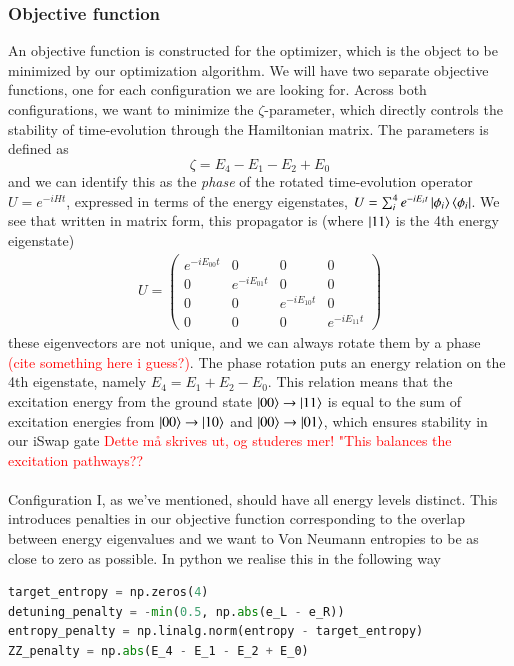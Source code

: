 \documentclass{subfiles}
\begin{document}
\subsubsection{Objective function}
An objective function is constructed for the optimizer, which is the object to be minimized by our optimization algorithm. We will have two separate objective functions, one for each configuration we are looking for. Across both configurations, we want to minimize the $\zeta$-parameter, which directly controls the stability of time-evolution through the Hamiltonian matrix. The parameters is defined as 
\begin{equation*}
    \zeta = E_4 - E_1 - E_2 + E_0
\end{equation*}
and we can identify this as the \emph{phase} of the rotated time-evolution operator $U = e^{-iHt}$, expressed in terms of the energy eigenstates, $U = \sum_i^4 e^{-iE_it}\ket{\phi_i}\bra{\phi_i}$. We see that written in matrix form, this propagator is (where $\ket{11}$ is the 4th energy eigenstate)
\begin{align*}
    U = \begin{pmatrix}
        e^{-iE_{00}t} & 0 & 0 & 0 \\
        0 & e^{-iE_{01}t} & 0 & 0 \\
        0 & 0 & e^{-iE_{10}t} & 0 \\
        0 & 0 & 0 & e^{-iE_{11}t}
    \end{pmatrix}
\end{align*}
these eigenvectors are not unique, and we can always rotate them by a phase \textcolor{red}{(cite something here i guess?)}. The phase rotation puts an energy relation on the 4th eigenstate, namely $E_4 = E_1 + E_2 - E_0$. This relation means that the excitation energy from the ground state $\ket{00} \rightarrow \ket{11}$ is equal to the sum of excitation energies from $\ket{00}\rightarrow \ket{10}$ and $\ket{00}\rightarrow\ket{01}$, which ensures stability in our iSwap gate \textcolor{red}{Dette må skrives ut, og studeres mer! "This balances the excitation pathways??} \\\\
Configuration I, as we've mentioned, should have all energy levels distinct. This introduces penalties in our objective function corresponding to the overlap between energy eigenvalues and we want to Von Neumann entropies to be as close to zero as possible. In python we realise this in the following way
\begin{lstlisting}[language=Python]
target_entropy = np.zeros(4)
detuning_penalty = -min(0.5, np.abs(e_L - e_R))
entropy_penalty = np.linalg.norm(entropy - target_entropy)
ZZ_penalty = np.abs(E_4 - E_1 - E_2 + E_0)
\end{lstlisting}
\end{document}
